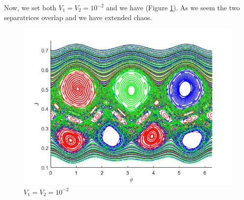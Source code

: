 Now, we set both $V_1=V_2=10^{-2}$ and we have (Figure \ref{fig2.8}). As we seem the two separatrices overlap and we have extended chaos.
%
\begin{figure}[H]
	\centering
	\includegraphics[scale=0.6]{Hamiltonian_1/numerical/figs/Q5_1e-2.1e-2_3634}
	\caption{$V_1=V_2=10^{-2}$}
	\label{fig2.8}
\end{figure}
